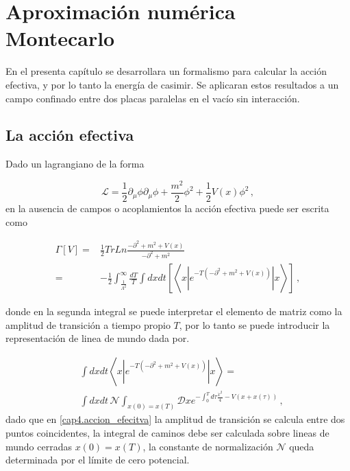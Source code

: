 \chapter{Aproximación numérica Montecarlo}
{\label{cap.singular}}

En el presenta capítulo se desarrollara un formalismo para calcular la acción efectiva, y por lo tanto la energía de casimir.
Se aplicaran estos resultados a un campo confinado entre dos placas paralelas en el vacío sin interacción.

\section{La acción efectiva}



Dado un lagrangiano de la forma


\begin{equation}
\mathscr{L} = \frac{1}{2} \partial _{\mu} \phi  \partial _{\mu} \phi +
	\frac{m^2}{2} \phi ^2  + \frac{1}{2} V(x) \phi ^2
	\, ,
\end{equation}
en la ausencia de campos o acoplamientos la acción efectiva puede ser escrita como


\begin{align}
\Gamma \left[ V \right] =&
  \frac{1}{2} Tr Ln \frac{- \partial ^2 + m ^2 + V(x)}{- \partial ^2 + m ^2} \\ 
 =& - \frac{1}{2} \int _{\frac{1}{\Lambda ^2}} ^{\infty} \frac{dT}{T} \int dx dt \left[ \left< x | e ^{-T (- \partial ^2 + m ^2 + V(x))} | x  \right> \right] \, ,
\label{cap4.accion_efecitva}
\end{align}


%

donde en la segunda integral se puede interpretar el elemento de matriz como la amplitud de transición a tiempo propio $T$, por lo tanto se puede introducir la representación de linea de mundo dada por.


\begin{align}
& \int dx  dt \left< x | e ^{-T (- \partial ^2 + m ^2 + V(x))} | x  \right> = \\
& \int dx  dt \, 
\mathcal{N}  \int _{x(0) = x(T)} \mathscr D x e ^{- \int _0 ^T d \tau  \frac{\dot{x} ^2}{4} - V(x + x( \tau )) }
\nonumber
\, ,
\label{eq.definicion_ensamble}
\end{align}
dado que en \eqref{cap4.accion_efecitva} la amplitud de transición se calcula entre dos puntos coincidentes, la integral de caminos debe ser calculada sobre lineas de mundo cerradas $x(0) = x(T)$, la constante de normalización $\mathcal{N}$ queda determinada por el límite de cero potencial.


